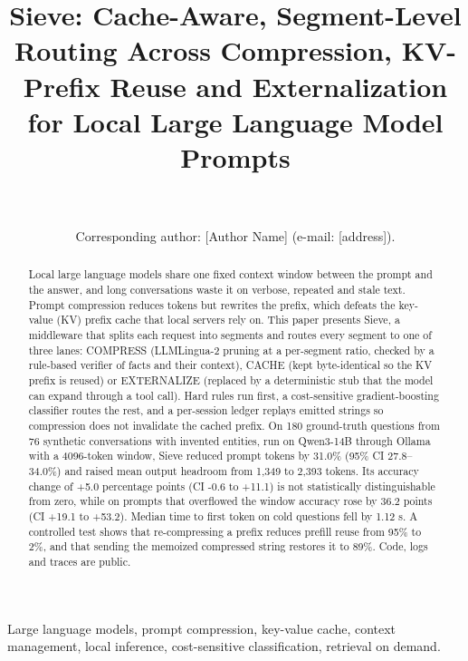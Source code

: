 \documentclass[journal]{IEEEtran}
\begin{document}
\title{Sieve: Cache-Aware, Segment-Level Routing Across Compression, KV-Prefix Reuse and Externalization for Local Large Language Model Prompts}
\author{\\
\\
Corresponding author: [Author Name] (e-mail: [address]).}
\maketitle
\pagestyle{accesshead}\thispagestyle{accesshead}

\begin{abstract}
Local large language models share one fixed context window between the prompt and the answer, and long conversations waste it on verbose, repeated and stale text. Prompt compression reduces tokens but rewrites the prefix, which defeats the key-value (KV) prefix cache that local servers rely on. This paper presents Sieve, a middleware that splits each request into segments and routes every segment to one of three lanes: COMPRESS (LLMLingua-2 pruning at a per-segment ratio, checked by a rule-based verifier of facts and their context), CACHE (kept byte-identical so the KV prefix is reused) or EXTERNALIZE (replaced by a deterministic stub that the model can expand through a tool call). Hard rules run first, a cost-sensitive gradient-boosting classifier routes the rest, and a per-session ledger replays emitted strings so compression does not invalidate the cached prefix. On 180 ground-truth questions from 76 synthetic conversations with invented entities, run on Qwen3-14B through Ollama with a 4096-token window, Sieve reduced prompt tokens by 31.0\% (95\% CI 27.8--34.0\%) and raised mean output headroom from 1,349 to 2,393 tokens. Its accuracy change of +5.0 percentage points (CI -0.6 to +11.1) is not statistically distinguishable from zero, while on prompts that overflowed the window accuracy rose by 36.2 points (CI +19.1 to +53.2). Median time to first token on cold questions fell by 1.12 s. A controlled test shows that re-compressing a prefix reduces prefill reuse from 95\% to 2\%, and that sending the memoized compressed string restores it to 89\%. Code, logs and traces are public.
\end{abstract}

\begin{IEEEkeywords}
Large language models, prompt compression, key-value cache, context management, local inference, cost-sensitive classification, retrieval on demand.
\end{IEEEkeywords}
\end{document}
